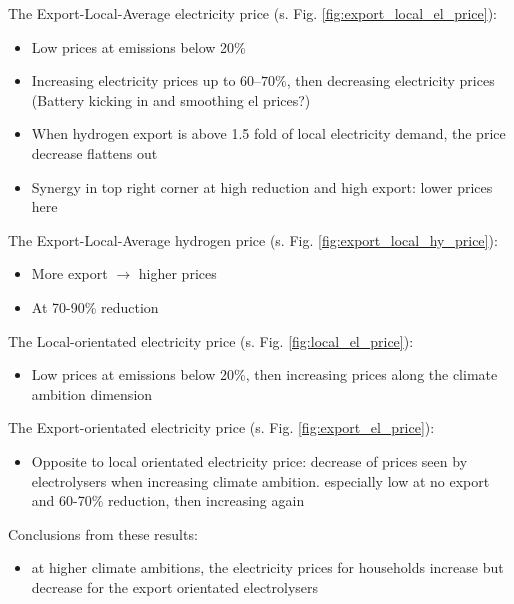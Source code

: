 The Export-Local-Average electricity price (s. Fig. \ref{fig:export_local_el_price}):
\begin{itemize}
    \item Low prices at emissions below 20\%
    \item Increasing electricity prices up to $60$--$70$\%, then decreasing electricity prices (Battery kicking in and smoothing el prices?)
    \item When hydrogen export is above 1.5 fold of local electricity demand, the price decrease flattens out
    \item Synergy in top right corner at high reduction and high export: lower prices here 
\end{itemize}

The Export-Local-Average hydrogen price (s. Fig. \ref{fig:export_local_hy_price}):
\begin{itemize}
    \item More export $\rightarrow$ higher prices
    \item At 70-90\% reduction
\end{itemize}

The Local-orientated electricity price (s. Fig. \ref{fig:local_el_price}):
\begin{itemize}
    \item Low prices at emissions below 20\%, then increasing prices along the climate ambition dimension
\end{itemize}

The Export-orientated electricity price (s. Fig. \ref{fig:export_el_price}):
\begin{itemize}
    \item Opposite to local orientated electricity price: decrease of prices seen by electrolysers when increasing climate ambition. especially low at no export and 60-70\% reduction, then increasing again
\end{itemize}


Conclusions from these results:
\begin{itemize}
    \item at higher climate ambitions, the electricity prices for households increase but decrease for the export orientated electrolysers
\end{itemize}

